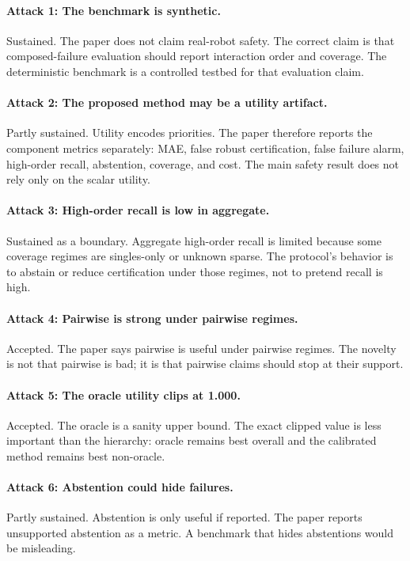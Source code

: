 \documentclass{article}
\begin{document}
\paragraph{Attack 1: The benchmark is synthetic.}
Sustained. The paper does not claim real-robot safety. The correct claim is that composed-failure evaluation should report interaction order and coverage. The deterministic benchmark is a controlled testbed for that evaluation claim.

\paragraph{Attack 2: The proposed method may be a utility artifact.}
Partly sustained. Utility encodes priorities. The paper therefore reports the component metrics separately: MAE, false robust certification, false failure alarm, high-order recall, abstention, coverage, and cost. The main safety result does not rely only on the scalar utility.

\paragraph{Attack 3: High-order recall is low in aggregate.}
Sustained as a boundary. Aggregate high-order recall is limited because some coverage regimes are singles-only or unknown sparse. The protocol's behavior is to abstain or reduce certification under those regimes, not to pretend recall is high.

\paragraph{Attack 4: Pairwise is strong under pairwise regimes.}
Accepted. The paper says pairwise is useful under pairwise regimes. The novelty is not that pairwise is bad; it is that pairwise claims should stop at their support.

\paragraph{Attack 5: The oracle utility clips at 1.000.}
Accepted. The oracle is a sanity upper bound. The exact clipped value is less important than the hierarchy: oracle remains best overall and the calibrated method remains best non-oracle.

\paragraph{Attack 6: Abstention could hide failures.}
Partly sustained. Abstention is only useful if reported. The paper reports unsupported abstention as a metric. A benchmark that hides abstentions would be misleading.
\end{document}
